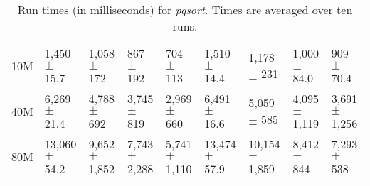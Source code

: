 \begin{table*}[p]
{{\begin{tabular}{|l| l l l l | l l l l |}
10M & 1,450 $\pm$ 15.7 & 1,058 $\pm$ 172 & 867 $\pm$ 192 & 704 $\pm$ 113 & 1,510
  $\pm$ 14.4 & 1,178 $\pm$ 231 & 1,000 $\pm$ 84.0 & 909 $\pm$ 70.4 \\
40M & 6,269 $\pm$ 21.4 & 4,788 $\pm$ 692 & 3,745 $\pm$ 819 & 2,969 $\pm$ 660 &
  6,491 $\pm$ 16.6 & 5,059 $\pm$ 585 & 4,095 $\pm$ 1,119 & 3,691 $\pm$ 1,256 \\
80M & 13,060 $\pm$ 54.2 & 9,652 $\pm$ 1,852 & 7,743 $\pm$ 2,288 & 5,741 $\pm$
  1,110 & 13,474 $\pm$ 57.9 & 10,154 $\pm$ 1,859 & 8,412 $\pm$ 844 & 7,293 $\pm$
  538 \\
\hline
\end{tabular}}}
\caption{Run times (in milliseconds) for \emph{pqsort}. Times are averaged over
ten runs.}
\label{tab:raw-pqsort}
\end{table*}

\endinput

